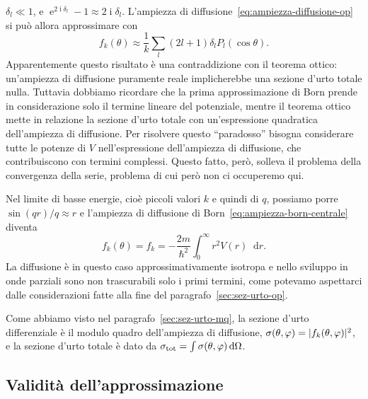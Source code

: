 \documentclass[a4paper,fleqn,twoside,12pt]{article}
\renewcommand{\phi}{\varphi}
\newcommand*{\dd}{\mathop{}\!\mathrm{d}} %
\DeclareMathOperator{\e}{\mathrm{e}} %
\DeclareMathOperator{\uimm}{\mathrm{i}} %
\DeclarePairedDelimiter{\abs}{\lvert}{\rvert}
\begin{document}
$\delta_{l} \ll 1$, e $\e^{2\uimm \delta_{l}} - 1 \approx 2\uimm \delta_{l}$.
L'ampiezza di diffusione~\eqref{eq:ampiezza-diffusione-op} si può allora
approssimare con
\begin{equation}
  f_{k}(\theta) \approx \frac{1}{k}\sum_{l}(2l+1) \delta_{l} P_{l}(\cos\theta).
\end{equation}
Apparentemente questo risultato è una contraddizione con il teorema ottico:
un'ampiezza di diffusione puramente reale implicherebbe una sezione d'urto
totale nulla.  Tuttavia dobbiamo ricordare che la prima approssimazione di Born
prende in considerazione solo il termine lineare del potenziale, mentre il
teorema ottico mette in relazione la sezione d'urto totale con un'espressione
quadratica dell'ampiezza di diffusione.  Per risolvere questo ``paradosso''
bisogna considerare tutte le potenze di $V$ nell'espressione dell'ampiezza di
diffusione, che contribuiscono con termini complessi.  Questo fatto, però,
solleva il problema della convergenza della serie, problema di cui però non ci
occuperemo qui.

Nel limite di basse energie, cioè piccoli valori $k$ e quindi di $q$, possiamo
porre $\sin(qr)/q \approx r$ e l'ampiezza di diffusione di
Born~\eqref{eq:ampiezza-born-centrale} diventa
\begin{equation}
  f_{k}(\theta) = f_{k} = -\frac{2m}{\hslash^{2}} \int_{0}^{\infty} r^{2}V(r)
  \dd r.
\end{equation}
La diffusione è in questo caso approssimativamente isotropa e nello sviluppo in
onde parziali sono non trascurabili solo i primi termini, come potevamo
aspettarci dalle considerazioni fatte alla fine del
paragrafo~\ref{sec:sez-urto-op}.

Come abbiamo visto nel paragrafo~\ref{sec:sez-urto-mq}, la sezione d'urto
differenziale è il modulo quadro dell'ampiezza di diffusione,
$\sigma(\theta,\phi) = \abs{f_{k}(\theta,\phi)}^{2}$, e la sezione d'urto totale
è dato da $\sigma_{\textup{tot}} = \int \sigma(\theta,\phi) \dd\Omega$.

\subsection{Validità dell'approssimazione}
\label{sec:validita-born}
\end{document}
